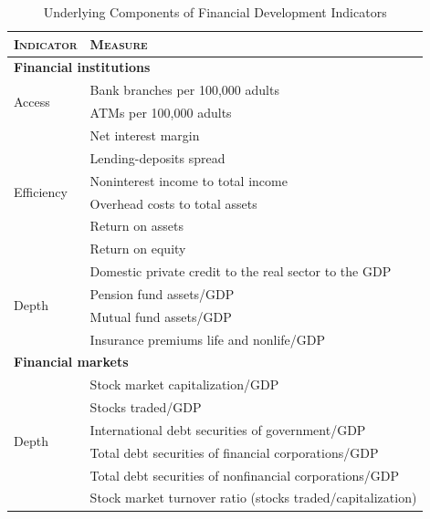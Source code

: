 \documentclass[a4paper,11pt]{article}
\begin{document}
\begin{table}[ht!]
    \small
    \caption{Underlying Components of Financial Development Indicators}
    \label{tab:finind}
    \centering
    \begin{tabular}{ll}
      \toprule
      \textsc{Indicator} & \textsc{Measure} \\
      \midrule
      \multicolumn{2}{l}{\textbf{Financial institutions}} \\
      \midrule
      \multirow{2}{*}{Access} 	& Bank branches per 100,000 adults \\
                                  & ATMs per 100,000 adults \\
      \midrule
      \multirow{6}{*}{Efficiency}		& Net interest margin \\
                                  & Lending-deposits spread \\ 
                                  & Noninterest income to total income \\
                                  & Overhead costs to total assets \\
                                  & Return on assets \\
                                  & Return on equity \\
            
      \midrule
      \multirow{4}{*}{Depth}	& Domestic private credit to the real sector to the GDP \\
                                  & Pension fund assets/GDP \\
                                  & Mutual fund assets/GDP \\
                                  & Insurance premiums life and nonlife/GDP \\
      \midrule
      \multicolumn{2}{l}{\textbf{Financial markets}} \\
      \midrule
      \multirow{6}{*}{Depth} 	& Stock market capitalization/GDP \\
                                  & Stocks traded/GDP \\
                                  & International debt securities of government/GDP \\
                                  & Total debt securities of financial corporations/GDP \\
                                  & Total debt securities of nonfinancial corporations/GDP \\
      \midrule
      Efficiency                  & Stock market turnover ratio (stocks traded/capitalization) \\
      \bottomrule
\end{tabular}
\end{table}


\renewcommand{\thesection}{A\arabic{section}}%
\renewcommand{\thetable}{A\arabic{table}}%
\renewcommand{\thefigure}{A\arabic{figure}}%
\renewcommand{\theequation}{A\arabic{eq}} 
\end{document}
